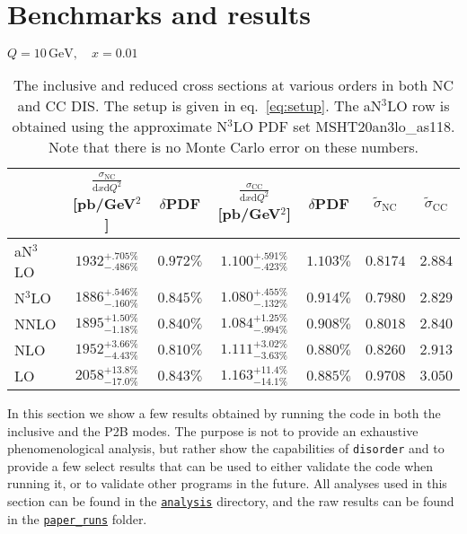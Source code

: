 \documentclass[submission, PhysCodeb]{SciPost_better_arXiv}
\newcommand{\disorder}{{\tt disorder}}
\newcommand{\dd}{\mathrm{d}}
\newcommand{\NC}{\mathrm{NC}}
\newcommand{\CC}{\mathrm{CC}}
\newcommand{\GEV}{\,\mathrm{GeV}}
\newcommand{\NNNLO}{N$^3$LO}
\newcommand{\ttt}[1]{\texttt{#1}}
\newcommand{\repolink}[2]{\href{https://github.com/alexanderkarlberg/disorder/blob/master/#1}{\ttt{#2}}}
\newcommand{\masterlink}[1]{\repolink{#1}{#1}}
\begin{document}
\section{Benchmarks and results}
\label{sec:results}
\begin{table}[t] 
  \centering
  \phantom{x}\medskip
  \begin{center} $Q = 10\GEV,\quad x = 0.01$\end{center}
  {\renewcommand{\arraystretch}{1.2}
  \begin{tabular}{lcccc|cc}
    \toprule
    & $\frac{\sigma_\NC}{\dd x \dd Q^2}$ [pb/GeV$^2$] & $\delta$PDF & $\frac{\sigma_\CC}{\dd x \dd Q^2}$ [pb/GeV$^2$] & $\delta$PDF & $\tilde{\sigma}_\NC$  & $\tilde{\sigma}_\CC$ \\ 
    \midrule
    a\NNNLO & $1932^{+.705\%}_{-.486\%}$ & $0.972\%$ & $1.100^{+.591\%}_{-.423\%}$ & $1.103\%$ & $0.8174$ & $2.884$\\    
    \NNNLO  & $1886^{+.546\%}_{-.160\%}$ & $0.845\%$ & $1.080^{+.455\%}_{-.132\%}$ & $0.914\%$ & $0.7980$ & $2.829$\\    
    NNLO    & $1895^{+1.50\%}_{-1.18\%}$ & $0.840\%$ & $1.084^{+1.25\%}_{-.994\%}$ & $0.908\%$ & $0.8018$ & $2.840$\\    
    NLO     & $1952^{+3.66\%}_{-4.43\%}$ & $0.810\%$ & $1.111^{+3.02\%}_{-3.63\%}$ & $0.880\%$ & $0.8260$ & $2.913$\\    
    LO      & $2058^{+13.8\%}_{-17.0\%}$ & $0.843\%$ & $1.163^{+11.4\%}_{-14.1\%}$ & $0.885\%$ & $0.9708$ & $3.050$\\    
    \bottomrule
  \end{tabular}}
  \caption{The inclusive and reduced cross sections at various orders
    in both NC and CC DIS. The setup is given in
    eq.~\eqref{eq:setup}. The a\NNNLO{} row is obtained using the
    approximate \NNNLO{} PDF set MSHT20an3lo\_as118. Note that there
    is no Monte Carlo error on these numbers.}
\label{tab:cross-sections}
\end{table}
In this section we show a few results obtained by running the code in
both the inclusive and the P2B modes. The purpose is not to provide an
exhaustive phenomenological analysis, but rather show the capabilities
of \disorder{} and to provide a few select results that can be used to
either validate the code when running it, or to validate other
programs in the future. All analyses used in this section can be found
in the \masterlink{analysis} directory, and the raw results can be found in
the \masterlink{paper\_runs} folder.
\end{document}
